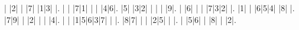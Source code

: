 \begin{sudoku-block}| |2| | |7| |1|3| |.
| | |7|1| | | |4|6|.
|5| |3|2| | | | |9|.
| |6| | | |7|3|2| |.
|1| | |6|5|4| |8| |.
|7|9| | |2| | | |4|.
| | |1|5|6|3|7| | |.
|8|7| | | |2|5| | |.
| |5|6| | |8| | |2|.
\end{sudoku-block}